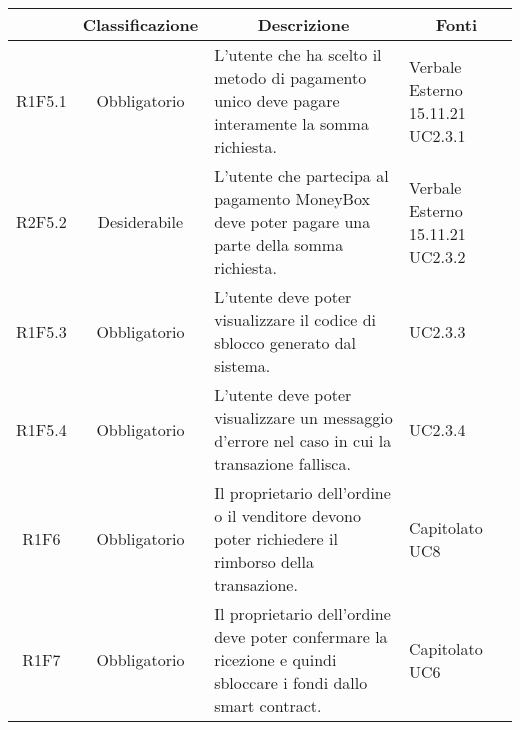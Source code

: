 \begin{table}[H]
    \centering
    \renewcommand{\arraystretch}{1.8}
    \begin{tabular}{c | c | p{6cm} | p{4.1cm}}
        \rowcolor[HTML]{125E28}
        \multicolumn{1}{c}{\color[HTML]{FFFFFF} \textbf{Codice}}          &
        \multicolumn{1}{c}{\color[HTML]{FFFFFF} \textbf{Classificazione}} &
        \multicolumn{1}{c}{\color[HTML]{FFFFFF} \textbf{Descrizione}}     &
        \multicolumn{1}{c}{\color[HTML]{FFFFFF} \textbf{Fonti}}                                                                                                                                                                                          \\
        \hline
        R1F5.1                                                            & Obbligatorio & L'utente che ha scelto il metodo di pagamento unico deve pagare interamente la somma richiesta.                       & Verbale Esterno 15.11.21 UC2.3.1      \\
        R2F5.2                                                            & Desiderabile & L'utente che partecipa al pagamento MoneyBox\glo{} deve poter pagare una parte della somma richiesta.                 & Verbale Esterno 15.11.21 UC2.3.2      \\
        R1F5.3                                                            & Obbligatorio & L'utente deve poter visualizzare il codice di sblocco generato dal sistema.                                           & UC2.3.3                               \\
        R1F5.4                                                            & Obbligatorio & L'utente deve poter visualizzare un messaggio d'errore nel caso in cui la transazione fallisca.                       & UC2.3.4                               \\
        R1F6                                                              & Obbligatorio & Il proprietario dell'ordine o il venditore devono poter richiedere il rimborso della transazione.                     & \Shortunderstack{Capitolato\\UC8\\}   \\
        R1F7                                                              & Obbligatorio & Il proprietario dell'ordine deve poter confermare la ricezione e quindi sbloccare i fondi dallo smart contract\glo{}. & \Shortunderstack{Capitolato\\UC6\\}   \\

\end{tabular}
\end{table}
